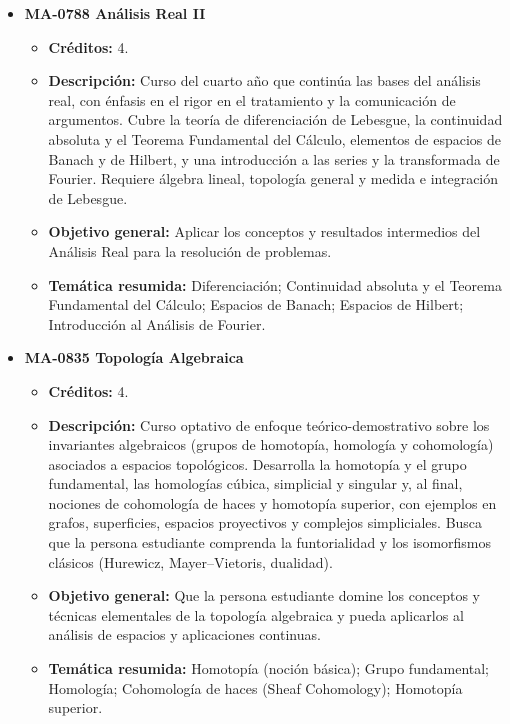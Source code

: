 \begin{itemize}[leftmargin=1.3em, itemsep=10pt, topsep=4pt, label={\color{Azul-UCR}$\blacksquare$}]
\item {\color{Azul-UCR}\textbf{MA-0788 Análisis Real II}}\par\nopagebreak\smallskip
\begin{itemize}[leftmargin=1.1em, itemsep=3pt, topsep=2pt, parsep=2pt, label={\textendash}]
\item \textbf{Créditos:} 4.
\item \textbf{Descripción:} Curso del cuarto año que continúa las bases del análisis real, con énfasis en el rigor en el tratamiento y la comunicación de argumentos. Cubre la teoría de diferenciación de Lebesgue, la continuidad absoluta y el Teorema Fundamental del Cálculo, elementos de espacios de Banach y de Hilbert, y una introducción a las series y la transformada de Fourier. Requiere álgebra lineal, topología general y medida e integración de Lebesgue.
\item \textbf{Objetivo general:} Aplicar los conceptos y resultados intermedios del Análisis Real para la resolución de problemas.
\item \textbf{Temática resumida:} Diferenciación; Continuidad absoluta y el Teorema Fundamental del Cálculo; Espacios de Banach; Espacios de Hilbert; Introducción al Análisis de Fourier.
\end{itemize}

\item {\color{Azul-UCR}\textbf{MA-0835 Topología Algebraica}}\par\nopagebreak\smallskip
\begin{itemize}[leftmargin=1.1em, itemsep=3pt, topsep=2pt, parsep=2pt, label={\textendash}]
\item \textbf{Créditos:} 4.
\item \textbf{Descripción:} Curso optativo de enfoque teórico-demostrativo sobre los invariantes algebraicos (grupos de homotopía, homología y cohomología) asociados a espacios topológicos. Desarrolla la homotopía y el grupo fundamental, las homologías cúbica, simplicial y singular y, al final, nociones de cohomología de haces y homotopía superior, con ejemplos en grafos, superficies, espacios proyectivos y complejos simpliciales. Busca que la persona estudiante comprenda la funtorialidad y los isomorfismos clásicos (Hurewicz, Mayer--Vietoris, dualidad).
\item \textbf{Objetivo general:} Que la persona estudiante domine los conceptos y técnicas elementales de la topología algebraica y pueda aplicarlos al análisis de espacios y aplicaciones continuas.
\item \textbf{Temática resumida:} Homotopía (noción básica); Grupo fundamental; Homología; Cohomología de haces (Sheaf Cohomology); Homotopía superior.
\end{itemize}


\end{itemize}
